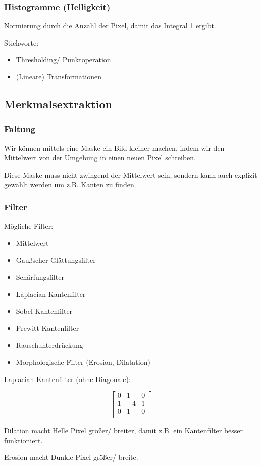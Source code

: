 \documentclass[a4paper]{article}
\begin{document}
\subsubsection{Histogramme (Helligkeit)}

Normierung durch die Anzahl der Pixel, damit das Integral 1 ergibt.


Stichworte:

\begin{itemize}
    \item Thresholding/ Punktoperation
    \item (Lineare) Transformationen
\end{itemize}

\subsection{Merkmalsextraktion}

\subsubsection{Faltung}

Wir können mittels eine Maske ein Bild kleiner machen, indem wir den Mittelwert von der Umgebung in einen neuen Pixel schreiben.

Diese Maske muss nicht zwingend der Mittelwert sein, sondern kann auch explizit gewählt werden um z.B. Kanten zu finden.

\subsubsection{Filter}

Mögliche Filter:

\begin{itemize}
    \item Mittelwert
    \item Gaußscher Glättungsfilter
    \item Schärfungsfilter
    \item Laplacian Kantenfilter
    \item Sobel Kantenfilter
    \item Prewitt Kantenfilter
    \item Rauschunterdrückung
    \item Morphologische Filter (Erosion, Dilatation)
\end{itemize}

Laplacian Kantenfilter (ohne Diagonale):

$$\begin{bmatrix}
    0 & 1 & 0\\
    1 & -4 & 1\\
    0 & 1 & 0\\
\end{bmatrix}$$

Dilation macht Helle Pixel größer/ breiter, damit z.B. ein Kantenfilter besser funktioniert.

Erosion macht Dunkle Pixel größer/ breite.
\end{document}

